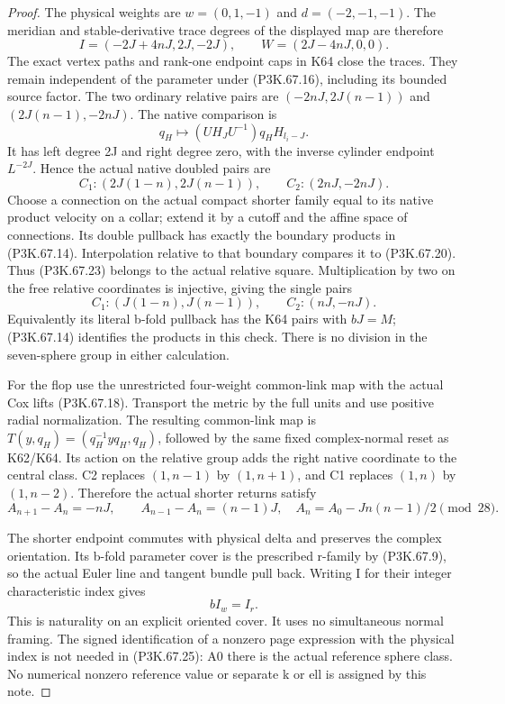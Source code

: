 \begin{proof}
The physical weights are \(w=(0,1,-1)\) and \(d=(-2,-1,-1)\).
The meridian and stable-derivative trace degrees of the displayed map
are therefore
\[
 I=(-2J+4nJ,2J,-2J),\qquad W=(2J-4nJ,0,0).
 \tag{P3K.67.21}
\]
The exact vertex paths and rank-one endpoint caps in K64 close the
traces. They remain independent of the parameter under (P3K.67.16),
including its bounded source factor. The two ordinary relative pairs
are \((-2nJ,2J(n-1))\) and \((2J(n-1),-2nJ)\).
The native comparison is
\[
 q_H\mapsto(UH_JU^{-1})q_HH_{l_i-J}.
 \tag{P3K.67.22}
\]
It has left degree 2J and right degree zero, with the inverse cylinder
endpoint \(L^{-2J}\). Hence the actual native doubled pairs are
\[
 C_1:(2J(1-n),2J(n-1)),\qquad C_2:(2nJ,-2nJ).
 \tag{P3K.67.23}
\]
Choose a connection on the actual compact shorter family equal to its
native product velocity on a collar; extend it by a cutoff and the
affine space of connections. Its double pullback has exactly the
boundary products in (P3K.67.14). Interpolation relative to that boundary
compares it to (P3K.67.20). Thus (P3K.67.23) belongs to the actual relative
square. Multiplication by two on the free relative coordinates is
injective, giving the single pairs
\[
 C_1:(J(1-n),J(n-1)),\qquad C_2:(nJ,-nJ).
 \tag{P3K.67.24}
\]
Equivalently its literal b-fold pullback has the K64 pairs with
\(bJ=M\); (P3K.67.14) identifies the products in this check. There is no
division in the seven-sphere group in either calculation.

For the flop use the unrestricted four-weight common-link map with
the actual Cox lifts (P3K.67.18). Transport the metric by the full units
and use positive radial normalization. The resulting common-link
map is \(T(y,q_H)=(q_H^{-1}yq_H,q_H)\), followed by the same fixed
complex-normal reset as K62/K64. Its action on the relative group
adds the right native coordinate to the central class. C2 replaces
\((1,n-1)\) by \((1,n+1)\), and C1 replaces \((1,n)\) by
\((1,n-2)\). Therefore the actual shorter returns satisfy
\[
 A_{n+1}-A_n=-nJ,\qquad A_{n-1}-A_n=(n-1)J,
 \quad A_n=A_0-Jn(n-1)/2\pmod {28}.
 \tag{P3K.67.25}
\]

The shorter endpoint commutes with physical delta and preserves the
complex orientation. Its b-fold parameter cover is the prescribed
r-family by (P3K.67.9), so the actual Euler line and tangent bundle pull
back. Writing I for their integer characteristic index gives
\[
                             bI_w=I_r.
 \tag{P3K.67.26}
\]
This is naturality on an explicit oriented cover. It uses no
simultaneous normal framing. The signed identification of a nonzero
page expression with the physical index is not needed in (P3K.67.25):
A0 there is the actual reference sphere class. No numerical nonzero
reference value or separate k or ell is assigned by this note.


\end{proof}
